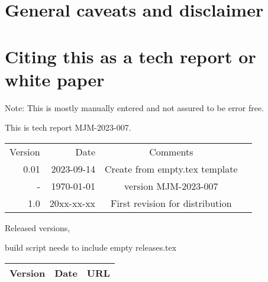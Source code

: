 \documentclass[aps,secnumarabic,balancelastpage,amsmath,amssymb,nofootinbib]{revtex4}
\newcommand{\mjmversion}{\mjmrelease} %
\newcommand{\mjmtrno}{MJM-2023-007}
\newcommand{\mjmversion}{0.00} %
\newcommand{\mjmtrno}{MJM-2023-007}
\newcommand{\mjmmakedate}{2023-09-14 }
\newcommand{\mjmversion}{ 0.00 }
\newcommand{\mjmtrno}{MJM-2023-007}
\newcommand{\mjmmakedate}{2023-09-14 }
\begin{document}
\begin{mdpicomment}
\section{General caveats and disclaimer }
\label{appendix:caveats}

%



\section{Citing this as a tech report or white paper }
\label{appendix:citing}

Note: This is mostly manually entered and not assured to be error free.

This is tech report \mjmtrno. 

\begin{table}[H] \centering
\begin{tabular}{r|r|c|r}
Version & Date & Comments  &  \\
0.01 & \mjmmakedate  &  Create from empty.tex template  &  \\
-  & \today & version  \mjmversion { }   \mjmtrno  &  \\
1.0 & 20xx-xx-xx & First revision for distribution &  \\
\end{tabular}
\end{table}


Released versions,

build script needs to include empty releases.tex
\begin{table}[H] \centering
\begin{tabular}{|r|r|l|}
Version & Date & URL    \\
\hline

\hline
\end{tabular}
\end{table}





%

\begin{minipage}{\linewidth}
%
%
\mjmshowbib
\end{minipage}




\begin{comment}

{@}TECHREPORT\{mmarchywka-\mjmtrno,


\end{comment}
\end{mdpicomment}
\end{document}
